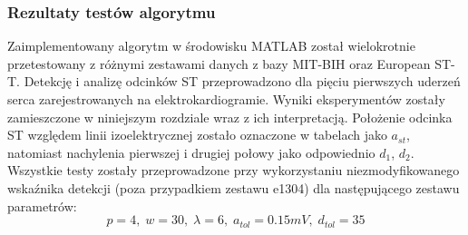 \subsubsection{Rezultaty testów algorytmu}
Zaimplementowany algorytm w środowisku MATLAB został wielokrotnie przetestowany z różnymi zestawami danych z bazy MIT-BIH oraz European ST-T. Detekcję i analizę odcinków ST przeprowadzono dla pięciu pierwszych uderzeń serca zarejestrowanych na elektrokardiogramie. Wyniki eksperymentów zostały zamieszczone w niniejszym rozdziale wraz z ich interpretacją. Położenie odcinka ST względem linii izoelektrycznej zostało oznaczone w tabelach jako $ a_{st} $, natomiast nachylenia pierwszej i drugiej połowy jako odpowiednio $ d_1 $, $ d_2 $.
Wszystkie testy zostały przeprowadzone przy wykorzystaniu niezmodyfikowanego wskaźnika detekcji (poza przypadkiem zestawu e1304) dla następującego zestawu parametrów:
\[ p = 4, \; w = 30, \; \lambda = 6, \; a_{tol} = 0.15 mV, \; d_{tol} = 35 \]

